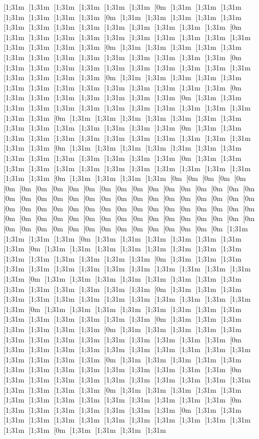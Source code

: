 [1;31m [1;31m [1;31m [1;31m [1;31m [1;31m [0m [1;31m [1;31m [1;31m [1;31m [1;31m [1;31m [1;31m [0m [1;31m [1;31m [1;31m [1;31m [1;31m [1;31m [1;31m [1;31m [1;31m [1;31m [1;31m [1;31m [1;31m [1;31m [0m [1;31m [1;31m [1;31m [1;31m [1;31m [1;31m [1;31m [1;31m [1;31m [1;31m [1;31m [1;31m [1;31m [1;31m [0m [1;31m [1;31m [1;31m [1;31m [1;31m [1;31m [1;31m [1;31m [1;31m [1;31m [1;31m [1;31m [1;31m [1;31m [0m [1;31m [1;31m [1;31m [1;31m [1;31m [1;31m [1;31m [1;31m [1;31m [1;31m [1;31m [1;31m [1;31m [1;31m [0m [1;31m [1;31m [1;31m [1;31m [1;31m [1;31m [1;31m [1;31m [1;31m [1;31m [1;31m [1;31m [1;31m [1;31m [0m [1;31m [1;31m [1;31m [1;31m [1;31m [1;31m [1;31m [0m [1;31m [1;31m [1;31m [1;31m [1;31m [1;31m [1;31m [1;31m [1;31m [1;31m [1;31m [1;31m [1;31m [1;31m [0m [1;31m [1;31m [1;31m [1;31m [1;31m [1;31m [1;31m [1;31m [1;31m [1;31m [1;31m [1;31m [1;31m [1;31m [0m [1;31m [1;31m [1;31m [1;31m [1;31m [1;31m [1;31m [1;31m [1;31m [1;31m [1;31m [1;31m [1;31m [1;31m [0m [1;31m [1;31m [1;31m [1;31m [1;31m [1;31m [1;31m [1;31m [1;31m [1;31m [1;31m [1;31m [1;31m [1;31m [0m [1;31m [1;31m [1;31m [1;31m [1;31m [1;31m [1;31m [1;31m [1;31m [1;31m [1;31m [1;31m [1;31m [1;31m [0m [1;31m [1;31m [1;31m [1;31m [0m [0m [0m [0m [0m [0m [0m [0m [0m [0m [0m [0m [0m [0m [0m [0m [0m [0m [0m [0m [0m [0m [0m [0m [0m [0m [0m [0m [0m [0m [0m [0m [0m [0m [0m [0m [0m [0m [0m [0m [0m [0m [0m [0m [0m [0m [0m [0m [0m [0m [0m [0m [0m [0m [0m [0m [0m [0m [0m [0m [0m [0m [0m [0m [0m [0m [0m [0m [0m [0m [0m [0m [0m [0m [0m [0m [0m [0m [0m [0m [0m [0m [0m [1;31m [1;31m [1;31m [1;31m [0m [1;31m [1;31m [1;31m [1;31m [1;31m [1;31m [1;31m [0m [1;31m [1;31m [1;31m [1;31m [1;31m [1;31m [1;31m [1;31m [1;31m [1;31m [1;31m [1;31m [1;31m [1;31m [0m [1;31m [1;31m [1;31m [1;31m [1;31m [1;31m [1;31m [1;31m [1;31m [1;31m [1;31m [1;31m [1;31m [1;31m [0m [1;31m [1;31m [1;31m [1;31m [1;31m [1;31m [1;31m [1;31m [1;31m [1;31m [1;31m [1;31m [1;31m [1;31m [0m [1;31m [1;31m [1;31m [1;31m [1;31m [1;31m [1;31m [1;31m [1;31m [1;31m [1;31m [1;31m [1;31m [1;31m [0m [1;31m [1;31m [1;31m [1;31m [1;31m [1;31m [1;31m [1;31m [1;31m [1;31m [1;31m [1;31m [1;31m [1;31m [0m [1;31m [1;31m [1;31m [1;31m [1;31m [1;31m [1;31m [0m [1;31m [1;31m [1;31m [1;31m [1;31m [1;31m [1;31m [1;31m [1;31m [1;31m [1;31m [1;31m [1;31m [1;31m [0m [1;31m [1;31m [1;31m [1;31m [1;31m [1;31m [1;31m [1;31m [1;31m [1;31m [1;31m [1;31m [1;31m [1;31m [0m [1;31m [1;31m [1;31m [1;31m [1;31m [1;31m [1;31m [1;31m [1;31m [1;31m [1;31m [1;31m [1;31m [1;31m [0m [1;31m [1;31m [1;31m [1;31m [1;31m [1;31m [1;31m [1;31m [1;31m [1;31m [1;31m [1;31m [1;31m [1;31m [0m [1;31m [1;31m [1;31m [1;31m [1;31m [1;31m [1;31m [1;31m [1;31m [1;31m [1;31m [1;31m [1;31m [1;31m [0m [1;31m [1;31m [1;31m [1;31m [1;31m [1;31m [1;31m [0m [1;31m [1;31m [1;31m [1;31m [1;31m [1;31m [1;31m [1;31m [1;31m [1;31m [1;31m [1;31m [1;31m [1;31m [0m [1;31m [1;31m [1;31m [1;31m 